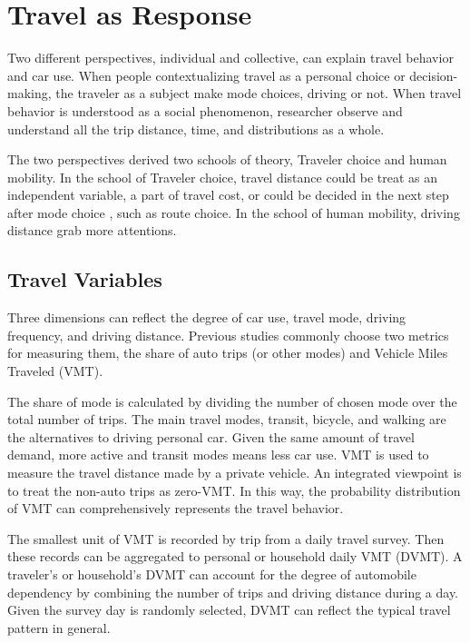 \documentclass[
  11pt,
  openany]{memoir}
\begin{document}
\hypertarget{travel}{%
\chapter{Travel as Response}\label{travel}}

Two different perspectives, individual and collective, can explain travel behavior and car use. When people contextualizing travel as a personal choice or decision-making, the traveler as a subject make mode choices, driving or not.
When travel behavior is understood as a social phenomenon, researcher observe and understand all the trip distance, time, and distributions as a whole.

The two perspectives derived two schools of theory, Traveler choice and human mobility. In the school of Traveler choice, travel distance could be treat as an independent variable, a part of travel cost, or could be decided in the next step after mode choice , such as route choice.
In the school of human mobility, driving distance grab more attentions.

\hypertarget{travel-variables}{%
\section{Travel Variables}\label{travel-variables}}

Three dimensions can reflect the degree of car use, travel mode, driving frequency, and driving distance.
Previous studies commonly choose two metrics for measuring them, the share of auto trips (or other modes) and Vehicle Miles Traveled (VMT).

The share of mode is calculated by dividing the number of chosen mode over the total number of trips.
The main travel modes, transit, bicycle, and walking are the alternatives to driving personal car.
Given the same amount of travel demand, more active and transit modes means less car use.
VMT is used to measure the travel distance made by a private vehicle.
An integrated viewpoint is to treat the non-auto trips as zero-VMT.
In this way, the probability distribution of VMT can comprehensively represents the travel behavior.

The smallest unit of VMT is recorded by trip from a daily travel survey. Then these records can be aggregated to personal or household daily VMT (DVMT).
A traveler's or household's DVMT can account for the degree of automobile dependency by combining the number of trips and driving distance during a day.
Given the survey day is randomly selected, DVMT can reflect the typical travel pattern in general.
\end{document}

